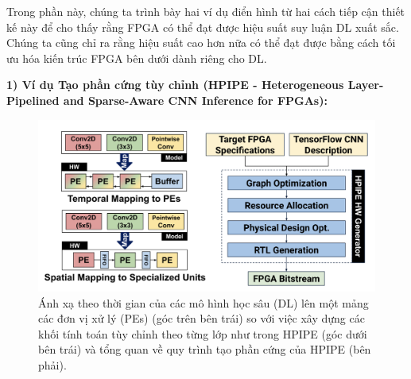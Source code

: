 \documentclass[a4paper]{article}
\begin{document}
Trong phần này, chúng ta trình bày hai ví dụ điển hình từ hai cách tiếp cận thiết kế này để cho thấy rằng FPGA có thể đạt được hiệu suất suy luận DL xuất sắc. Chúng ta cũng chỉ ra rằng hiệu suất cao hơn nữa có thể đạt được bằng cách tối ưu hóa kiến trúc FPGA bên dưới dành riêng cho DL.

\textbf{1) Ví dụ Tạo phần cứng tùy chỉnh (HPIPE - Heterogeneous Layer-Pipelined and Sparse-Aware CNN Inference for FPGAs):}

\begin{figure} [!h]
    \centering
    \includegraphics[width=0.75\linewidth]{assets/fpga_5.png}
    \caption{Ánh xạ theo thời gian của các mô hình học sâu (DL) lên một mảng các đơn vị xử lý (PEs) (góc trên bên trái) so với việc xây dựng các khối tính toán tùy chỉnh theo từng lớp như trong HPIPE (góc dưới bên trái) và tổng quan về quy trình tạo phần cứng của HPIPE (bên phải).}
    \label{fig:fpga_5}
\end{figure}
\end{document}
